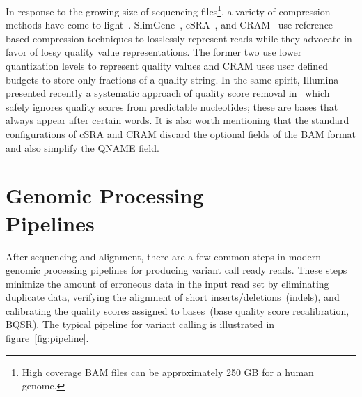 \documentclass[10pt,twocolumn]{article}
\theoremstyle{plain}
\begin{document}
In response to the growing size of sequencing files\footnote{High coverage BAM files can be approximately 250 GB for a human genome.},
a variety of compression methods have come to light~\cite{kozanitis2011, fritz11, WanBioinformatics, Popitsch2012, Asnani2012, CoxBW, 
recoil, Jones2012, Janin2013}. SlimGene~\cite{kozanitis2011}, cSRA~\cite{SRA}, and CRAM~\cite{fritz11} use reference based compression
techniques to losslessly represent reads while they advocate in favor of lossy quality value representations. The former two use lower
quantization levels to represent quality values and CRAM uses user defined budgets to store only fractions of a quality string. 
In the same spirit, Illumina presented recently a systematic approach of quality score removal in~\cite{Janin2013} which safely ignores
quality scores from predictable nucleotides; these are bases that always appear after certain words. It is also worth mentioning that the
standard configurations of cSRA and CRAM discard the optional fields of the BAM format and also simplify the QNAME field. 

\section{Genomic Processing\\Pipelines}
\label{sec:genomic-processing-pipelines}

After sequencing and alignment, there are a few common steps in modern genomic processing pipelines for producing
variant call ready reads. These steps minimize the amount of erroneous data in the input read set by eliminating duplicate data,
verifying the alignment of short inserts/deletions~(indels), and calibrating the quality scores assigned to bases~(base quality score
recalibration, BQSR). The typical pipeline for variant calling is illustrated in figure~\ref{fig:pipeline}.
\end{document}
